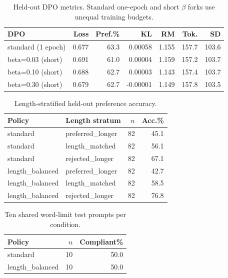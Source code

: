 \begin{table}[!htbp]
\centering
\caption{Held-out DPO metrics. Standard one-epoch and short $\beta$ forks use unequal training budgets.}
\label{tab:dpo-summary}
\scriptsize
\setlength{\tabcolsep}{3.4pt}
\begin{tabular}{lrrrrrr}
\toprule
DPO & Loss & Pref.\% & KL & RM & Tok. & SD \\
\midrule
standard (1 epoch) & 0.677 & 63.3 & 0.00058 & 1.155 & 157.7 & 103.6 \\
beta=0.03 (short) & 0.691 & 61.0 & 0.00004 & 1.159 & 157.2 & 103.7 \\
beta=0.10 (short) & 0.688 & 62.7 & 0.00003 & 1.143 & 157.4 & 103.7 \\
beta=0.30 (short) & 0.679 & 62.7 & -0.00001 & 1.149 & 157.8 & 103.5 \\
\bottomrule
\end{tabular}
\end{table}

\begin{table}[!htbp]
\centering
\caption{Length-stratified held-out preference accuracy.}
\label{tab:dpo-strata}
\scriptsize
\setlength{\tabcolsep}{3.4pt}
\begin{tabular}{llrr}
\toprule
Policy & Length stratum & $n$ & Acc.\% \\
\midrule
standard & preferred\_longer & 82 & 45.1 \\
standard & length\_matched & 82 & 56.1 \\
standard & rejected\_longer & 82 & 67.1 \\
length\_balanced & preferred\_longer & 82 & 42.7 \\
length\_balanced & length\_matched & 82 & 58.5 \\
length\_balanced & rejected\_longer & 82 & 76.8 \\
\bottomrule
\end{tabular}
\end{table}

\begin{table}[!htbp]
\centering
\caption{Ten shared word-limit test prompts per condition.}
\label{tab:dpo-word}
\scriptsize
\setlength{\tabcolsep}{3.4pt}
\begin{tabular}{lrr}
\toprule
Policy & $n$ & Compliant\% \\
\midrule
standard & 10 & 50.0 \\
length\_balanced & 10 & 50.0 \\
\bottomrule
\end{tabular}
\end{table}

